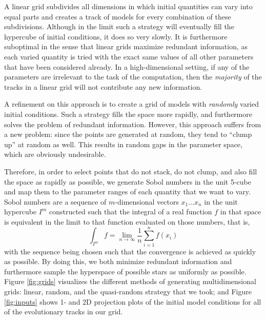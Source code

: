 \documentclass[manuscript]{aastex}
\begin{document}
A linear grid subdivides all dimensions in which initial quantities can vary into equal parts and creates a track of models for every combination of these subdivisions. Although in the limit such a strategy will eventually fill the hypercube of initial conditions, it does so very slowly. It is furthermore suboptimal in the sense that linear grids maximize redundant information, as each varied quantity is tried with the exact same values of all other parameters that have been considered already. In a high-dimensional setting, if any of the parameters are irrelevant to the task of the computation, then the \emph{majority} of the tracks in a linear grid will not contribute any new information.

A refinement on this approach is to create a grid of models with \emph{randomly} varied initial conditions. Such a strategy fills the space more rapidly, and furthermore solves the problem of redundant information. However, this approach suffers from a new problem: since the points are generated at random, they tend to ``clump up'' at random as well. This results in random gaps in the parameter space, which are obviously undesirable. %

Therefore, in order to select points that do not stack, do not clump, and also fill the space as rapidly as possible, we generate Sobol numbers \citep{sobol1967distribution} in the unit 5-cube and map them to the parameter ranges of each quantity that we want to vary. Sobol numbers are a sequence of $m$-dimensional vectors $x_1 \ldots x_n$ in the unit hypercube $I^m$ constructed such that the integral of a real function $f$ in that space is equivalent in the limit to that function evaluated on those numbers, that is,
\begin{equation}
    \int_{I^m} f = \lim_{n \to \infty} \frac{1}{n}\sum_{i=1}^n f(x_i)
\end{equation}
with the sequence being chosen such that the convergence is achieved as quickly as possible. By doing this, we both minimize redundant information and furthermore sample the hyperspace of possible stars as uniformly as possible. Figure \ref{fig:grids} visualizes the different methods of generating multidimensional grids: linear, random, and the quasi-random strategy that we took; and Figure \ref{fig:inputs} shows 1- and 2D projection plots of the initial model conditions for all of the evolutionary tracks in our grid. 
\end{document}
